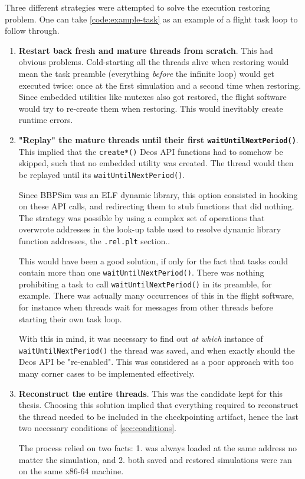 Three different strategies were attempted to solve the execution restoring problem. One can take \autoref{code:example-task} as an example of a flight task loop to follow through.
\begin{enumerate}
	\item \textbf{Restart back fresh and mature threads from scratch}. This had obvious problems.  Cold-starting all the threads alive when restoring would mean the task preamble (everything \textit{before} the infinite loop) would get executed twice: once at the first simulation and a second time when restoring. Since embedded utilities like mutexes also got restored, the flight software would try to re-create them when restoring. This would inevitably create runtime errors.
	
	\item \textbf{"Replay" the mature threads until their first \texttt{waitUntilNextPeriod()}}. This implied that the \texttt{create*()} Deos API functions had to somehow be skipped, such that no embedded utility was created. The thread would then be replayed until its \texttt{waitUntilNextPeriod()}.
	
	Since \gls{BBPSim} was an \gls{ELF} dynamic library, this option consisted in hooking on these API calls, and redirecting them to stub functions that did nothing. The strategy was possible by using a complex set of operations that overwrote addresses in the look-up table used to resolve dynamic library function addresses, the \texttt{.rel.plt} section.\cite{online:shoumikhin}.
	
	This would have been a good solution, if only for the fact that tasks could contain more than one \texttt{waitUntilNextPeriod()}. There was nothing prohibiting a task to call \texttt{waitUntilNextPeriod()} in its preamble, for example. There was actually many occurrences of this in the flight software, for instance when threads wait for messages from other threads before starting their own task loop.
	
	With this in mind, it was necessary to find out \textit{at which} instance of \texttt{waitUntilNextPeriod()} the thread was saved, and when exactly should the Deos API be "re-enabled". This was considered as a poor approach with too many corner cases to be implemented effectively.
	
	\item \textbf{Reconstruct the entire threads}. This was the candidate kept for this thesis. Choosing this solution implied that everything required to reconstruct the thread needed to be included in the checkpointing artifact, hence the last two necessary conditions of \autoref{sec:conditions}. 
	
	The process relied on two facts: 1.  was always loaded at the same address no matter the simulation, and 2. both saved and restored simulations were ran on the same x86-64 machine. 
\end{enumerate}

